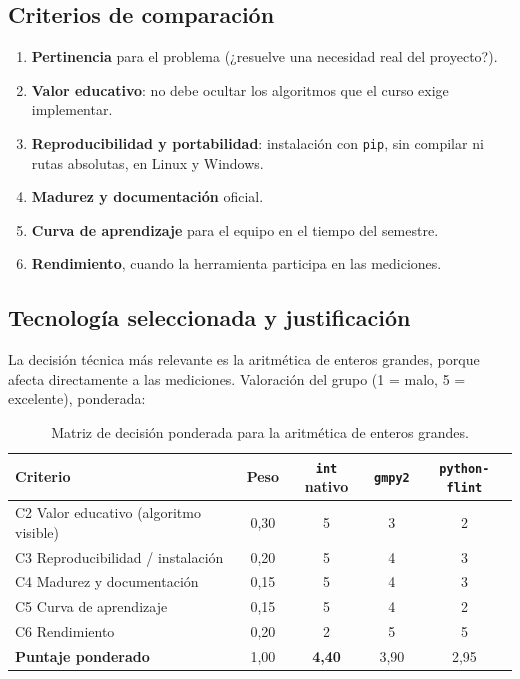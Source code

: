 \subsection{Criterios de comparación}

\begin{enumerate}
  \item[C1] \textbf{Pertinencia} para el problema (¿resuelve una necesidad real del proyecto?).
  \item[C2] \textbf{Valor educativo}: no debe ocultar los algoritmos que el curso exige implementar.
  \item[C3] \textbf{Reproducibilidad y portabilidad}: instalación con \texttt{pip}, sin compilar ni rutas absolutas, en Linux y Windows.
  \item[C4] \textbf{Madurez y documentación} oficial.
  \item[C5] \textbf{Curva de aprendizaje} para el equipo en el tiempo del semestre.
  \item[C6] \textbf{Rendimiento}, cuando la herramienta participa en las mediciones.
\end{enumerate}

\subsection{Tecnología seleccionada y justificación}

La decisión técnica más relevante es la aritmética de enteros grandes, porque
afecta directamente a las mediciones. Valoración del grupo (1 = malo,
5 = excelente), ponderada:

\begin{table}[H]
\centering\small
\caption{Matriz de decisión ponderada para la aritmética de enteros grandes.}
\label{tab:decision}
\begin{tabular}{@{}l c c c c@{}}
\toprule
\textbf{Criterio} & \textbf{Peso} & \texttt{int} nativo & \texttt{gmpy2} & \texttt{python-flint}\\
\midrule
C2 Valor educativo (algoritmo visible) & 0,30 & 5 & 3 & 2\\
C3 Reproducibilidad / instalación & 0,20 & 5 & 4 & 3\\
C4 Madurez y documentación & 0,15 & 5 & 4 & 3\\
C5 Curva de aprendizaje & 0,15 & 5 & 4 & 2\\
C6 Rendimiento & 0,20 & 2 & 5 & 5\\
\midrule
\textbf{Puntaje ponderado} & 1,00 & \textbf{4,40} & 3,90 & 2,95\\
\bottomrule
\end{tabular}
\end{table}

